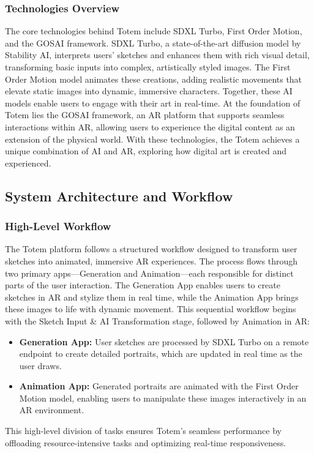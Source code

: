 \subsubsection{Technologies Overview}
The core technologies behind Totem include SDXL Turbo\cite{sauer2023adversarial}, First Order Motion\cite{Siarohin_2019_NeurIPS}, and the GOSAI framework\cite{gosai2022}.
SDXL Turbo, a state-of-the-art diffusion model by Stability AI, interprets users' sketches and enhances them with rich visual detail, transforming basic inputs into complex, artistically styled images.
The First Order Motion model animates these creations, adding realistic movements that elevate static images into dynamic, immersive characters.
Together, these AI models enable users to engage with their art in real-time.
At the foundation of Totem lies the GOSAI framework, an AR platform that supports seamless interactions within AR, allowing users to experience the digital content as an extension of the physical world.
With these technologies, the Totem achieves a unique combination of AI and AR, exploring how digital art is created and experienced.

\subsection{ System Architecture and Workflow }

\subsubsection{High-Level Workflow}
The Totem platform follows a structured workflow designed to transform user sketches into animated, immersive AR experiences.
The process flows through two primary apps—Generation and Animation—each responsible for distinct parts of the user interaction.
The Generation App enables users to create sketches in AR and stylize them in real time, while the Animation App brings these images to life with dynamic movement.
This sequential workflow begins with the Sketch Input & AI Transformation stage, followed by Animation in AR:

\begin{itemize}
    \item \textbf{Generation App:} User sketches are processed by SDXL Turbo on a remote endpoint to create detailed portraits, which are updated in real time as the user draws.
    \item  \textbf{Animation App:} Generated portraits are animated with the First Order Motion model, enabling users to manipulate these images interactively in an AR environment.
\end{itemize}
This high-level division of tasks ensures Totem’s seamless performance by offloading resource-intensive tasks and optimizing real-time responsiveness.

